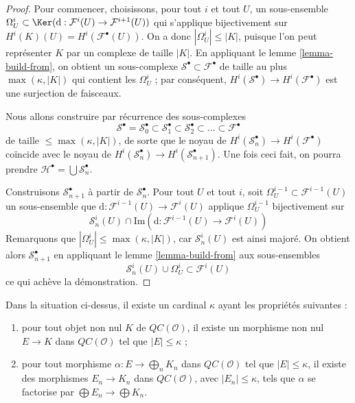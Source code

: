 \begin{proof}
Pour commencer, choisissons, pour tout $i$ et tout $U$, un sous-ensemble
$\Omega^i_U \subset \Ker(\text{d} :
\mathcal{F}^i(U) \to \mathcal{F}^{i + 1}(U))$
qui s'applique bijectivement sur
$H^i(K)(U) = H^i(\mathcal{F}^\bullet(U))$.
On a donc $|\Omega^i_U| \leq |K|$, puisque l'on peut représenter $K$ par un
complexe de taille $|K|$. En appliquant le lemme \ref{lemma-build-from}, on
obtient un sous-complexe
$\mathcal{S}^\bullet \subset \mathcal{F}^\bullet$ de taille au plus
$\max(\kappa, |K|)$ qui contient les $\Omega^i_U$ ; par conséquent,
$H^i(\mathcal{S}^\bullet) \to H^i(\mathcal{F}^\bullet)$ est une surjection de
faisceaux.

\medskip\noindent
Nous allons construire par récurrence des sous-complexes
$$
\mathcal{S}^\bullet =
\mathcal{S}_0^\bullet \subset
\mathcal{S}_1^\bullet \subset
\mathcal{S}_2^\bullet \subset \ldots \subset \mathcal{F}^\bullet
$$
de taille $\leq \max(\kappa, |K|)$, de sorte que le noyau de
$H^i(\mathcal{S}_n^\bullet) \to H^i(\mathcal{F}^\bullet)$ coïncide avec le
noyau de
$H^i(\mathcal{S}_n^\bullet) \to H^i(\mathcal{S}_{n + 1}^\bullet)$.
Une fois ceci fait, on pourra prendre
$\mathcal{H}^\bullet = \bigcup \mathcal{S}_n^\bullet$.

\medskip\noindent
Construisons $\mathcal{S}_{n + 1}^\bullet$ à partir de
$\mathcal{S}_n^\bullet$. Pour tout $U$ et tout $i$, soit
$\Omega^{i - 1}_U \subset \mathcal{F}^{i - 1}(U)$ un sous-ensemble que
$\text{d} : \mathcal{F}^{i - 1}(U) \to \mathcal{F}^i(U)$ applique
$\Omega^{i - 1}_U$ bijectivement sur
$$
\mathcal{S}_n^i(U) \cap
\text{Im}(\text{d} : \mathcal{F}^{i - 1}(U)\to \mathcal{F}^i(U))
$$
Remarquons que $|\Omega^i_U| \leq \max(\kappa,|K|)$, car
$\mathcal{S}_n^i(U)$ est ainsi majoré. On obtient alors
$\mathcal{S}_{n + 1}^\bullet$ en appliquant le lemme
\ref{lemma-build-from} aux sous-ensembles
$$
\mathcal{S}_n^i(U) \cup \Omega^i_U \subset \mathcal{F}^i(U)
$$
ce qui achève la démonstration.
\end{proof}

\begin{lemma}
\label{lemma-cartesian-colimit-kappa}
Dans la situation ci-dessus, il existe un cardinal $\kappa$ ayant les
propriétés suivantes :
\begin{enumerate}
\item pour tout objet non nul $K$ de $\mathit{QC}(\mathcal{O})$, il existe un
morphisme non nul $E \to K$ dans $\mathit{QC}(\mathcal{O})$ tel que
$|E| \leq \kappa$ ;
\item pour tout morphisme $\alpha : E \to \bigoplus_n K_n$ dans
$\mathit{QC}(\mathcal{O})$ tel que $|E| \leq \kappa$, il existe des
morphismes $E_n \to K_n$ dans $\mathit{QC}(\mathcal{O})$, avec
$|E_n| \leq \kappa$, tels que $\alpha$ se factorise par
$\bigoplus E_n \to \bigoplus K_n$.
\end{enumerate}
\end{lemma}

